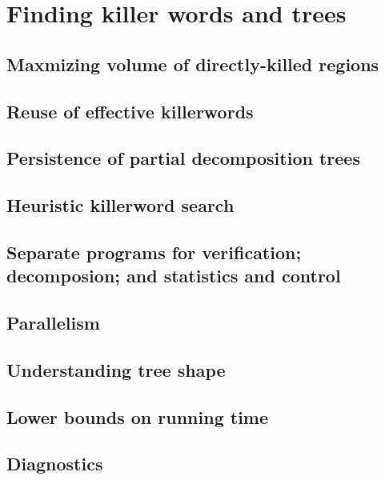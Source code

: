 \chapter{Finding killer words and trees}\label{Ch.Crumbs}
\section{Maxmizing volume of directly-killed regions}
\section{Reuse of effective killerwords}
\section{Persistence of partial decomposition trees}
\section{Heuristic killerword search}
\section{Separate programs for verification; decomposion; and statistics and control}
\section{Parallelism}
\section{Understanding tree shape}
\section{Lower bounds on running time}
\section{Diagnostics}

